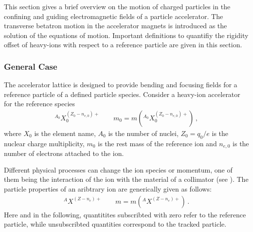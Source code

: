 This section gives a brief overview on the motion of charged particles in the confining and guiding electromagnetic fields of a particle accelerator. The transverse betatron motion in the accelerator magnets is introduced as the solution of the equations of motion. Important definitions to quantifiy the rigidity offset of heavy-ions with respect to a reference particle are given in this section.

\subsubsection{General Case}
%
The accelerator lattice is designed to provide bending and focusing fields for a reference particle of a defined particle species. Consider a heavy-ion accelerator for the reference species
\begin{align}
^{A_0}X_0^{(Z_0-n_{e,0})+} \quad \quad m_0 = m\left( ^{A_0}X_0^{(Z_0-n_{e,0})+} \right) \, ,
\end{align}
where $X_0$ is the element name, $A_0$ is the number of nuclei, $Z_0=q_0/e$ is the nuclear charge multiplicity, $m_0$ is the rest mass of the reference ion and $n_{e,0}$ is the number of electrons attached to the ion. 

Different physical processes can change the ion species or momentum, one of them being the interaction of the ion with the material of a collimator (see ). The particle properties of an aribtrary ion are generically given as follows:
\begin{align}
^{A}X^{(Z-n_{e})+} \quad \quad m = m\left( ^{A}X^{(Z-n_e)+} \right) \, .
\end{align}
Here and in the following, quantitites subscribted with zero refer to the reference particle, while unsubscribted quantities correspond to the tracked particle. 



